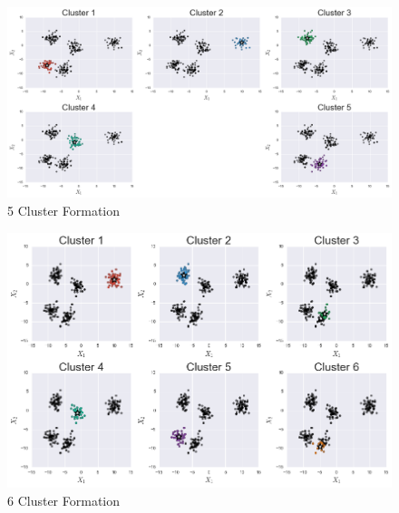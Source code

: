 \documentclass[10pt,twocolumn,letterpaper]{article}
\begin{document}
\begin{appendices}
\begin{figure}[htbp] 
\begin{center}
\includegraphics[scale=0.45]{figure/5_fomration.png}
\end{center}

\caption{\label{fig:5-Cluster-Formation}5 Cluster Formation}


\end{figure}


\begin{figure}[htbp] 
\begin{center}
\includegraphics[scale=0.45]{figure/6_formation.png}
\end{center}

\caption{\label{fig:6-Cluster-Formation}6 Cluster Formation}


\end{figure}

\end{appendices}
\end{document}
